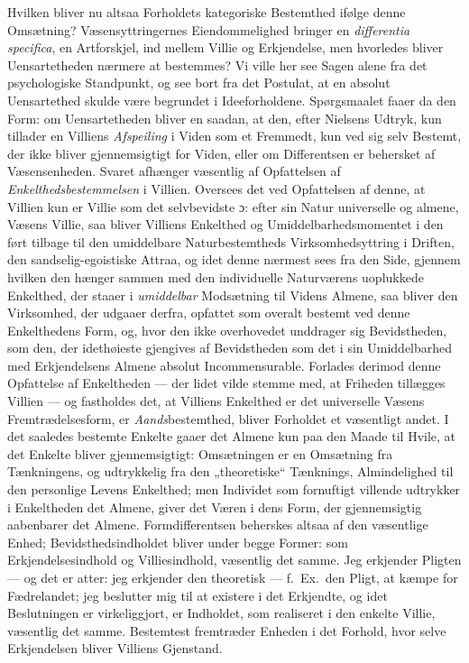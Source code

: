 \documentclass[12pt,a4paper]{book}
\newcommand{\opage}[1]{\marginnote{\footnotesize\textit{[#1]}}}
\begin{document}
Hvilken bliver nu altsaa Forholdets kategoriske Bestemthed ifølge denne
Omsætning? Væsensyttringernes Eiendommelighed bringer en
\textit{differentia specifica}, en Artforskjel, ind mellem Villie og
Erkjendelse, men hvorledes bliver Uensartetheden nærmere at bestemmes?
Vi ville her see Sagen alene fra det psychologiske Standpunkt, og see
bort fra det Postulat, at en absolut Uensartethed skulde være be\opage{139}grundet
i Ideeforholdene. Spørgsmaalet faaer da den Form: om Uensartetheden
bliver en saadan, at den, efter Nielsens Udtryk, kun tillader en
Villiens \emph{Afspeiling} i Viden som et Fremmedt, kun ved sig selv Bestemt,
der ikke bliver gjennemsigtigt for Viden, eller om Differentsen er
behersket af Væsensenheden. Svaret afhænger væsentlig af Opfattelsen af
\emph{Enkelthedsbestemmelsen} i Villien. Oversees det ved Opfattelsen af
denne, at Villien kun er Villie som det selvbevidste ɔ: efter sin Natur
universelle og almene, Væsens Villie, saa bliver Villiens Enkelthed og
Umiddelbarhedsmomentet i den ført tilbage til den umiddelbare
Naturbestemtheds Virksomhedsyttring i Driften, den sandselig-egoistiske
Attraa, og idet denne nærmest sees fra den Side, gjennem hvilken den
hænger sammen med den individuelle Naturværens uoplukkede Enkelthed,
der staaer i \emph{umiddelbar} Modsætning til Videns Almene, saa bliver den
Virksomhed, der udgaaer derfra, opfattet som overalt bestemt ved denne
Enkelthedens Form, og, hvor den ikke overhovedet unddrager sig
Bevidstheden, som den, der idethøieste gjengives af Bevidstheden som
det i sin Umiddelbarhed med Erkjendelsens Almene absolut
Incommensurable. Forlades derimod denne Opfattelse af Enkeltheden ---
der lidet vilde stemme med, at Friheden tillægges Villien --- og
fastholdes det, at Villiens Enkelthed er det universelle Væsens
Fremtrædelsesform, er \emph{Aands}bestemthed, bliver Forholdet et væsentligt
andet. I det saaledes bestemte Enkelte gaaer det Almene kun paa den
Maade til Hvile, at det Enkelte bliver gjennemsigtigt: Omsætningen er
en Omsætning fra Tænkningens, og udtrykkelig fra den „theoretiske“
Tænknings, Almindelighed til den personlige Levens Enkelthed; men
Individet som fornuftigt villende udtrykker i Enkeltheden det Almene,
giver det Væren i dens Form, der gjennemsigtig aabenbarer det Almene.
Formdifferentsen beherskes altsaa af den væsentlige Enhed;
Bevidsthedsindholdet bliver under begge Former: som Erkjendelsesindhold
og Villiesindhold, væsentlig det samme. Jeg erkjender Pligten --- og
det er atter: jeg erkjender den theoretisk --- f.~Ex.\ den Pligt, \opage{140}at
kæmpe for Fædrelandet; jeg beslutter mig til at existere i det
Erkjendte, og idet Beslutningen er virkeliggjort, er Indholdet, som
realiseret i den enkelte Villie, væsentlig det samme. Bestemtest
fremtræder Enheden i det Forhold, hvor selve Erkjendelsen bliver
Villiens Gjenstand.
\end{document}

